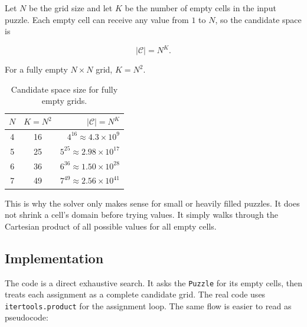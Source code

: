 Let $N$ be the grid size and let $K$ be the number of empty cells in the input
puzzle. Each empty cell can receive any value from $1$ to $N$, so the candidate
space is

\begin{equation}
  |\mathcal{C}| = N^{K}.
  \label{eq:bf_candidates}
\end{equation}

For a fully empty $N \times N$ grid, $K = N^{2}$.

\begin{table}[h]
  \centering
  \caption{Candidate space size for fully empty grids.}
  \label{tab:bf_space}
  \begin{tabular}{ccr}
    \toprule
    $N$ & $K = N^{2}$ & $|\mathcal{C}| = N^{K}$ \\
    \midrule
    4 & 16 & $4^{16} \approx 4.3 \times 10^{9}$ \\
    5 & 25 & $5^{25} \approx 2.98 \times 10^{17}$ \\
    6 & 36 & $6^{36} \approx 1.50 \times 10^{28}$ \\
    7 & 49 & $7^{49} \approx 2.56 \times 10^{41}$ \\
    \bottomrule
  \end{tabular}
\end{table}

This is why the solver only makes sense for small or heavily filled puzzles. It
does not shrink a cell's domain before trying values. It simply walks through
the Cartesian product of all possible values for all empty cells.

\subsection{Implementation}

The code is a direct exhaustive search. It asks the \texttt{Puzzle} for its
empty cells, then treats each assignment as a complete candidate grid. The real
code uses \texttt{itertools.product} for the assignment loop. The same flow is
easier to read as pseudocode:

